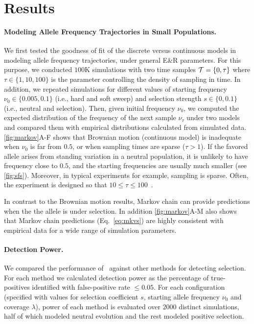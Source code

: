 \section{Results}
\paragraph{Modeling Allele Frequency Trajectories in Small Populations.} 
We first tested the goodness of fit of the discrete versus continuous models in 
modeling allele frequency trajectories, under general E\&R parameters.  For 
this 
purpose, we conducted $100$K
simulations with two time samples ${\cal T}=\{0,\tau\}$ where $\tau\in
\{1,10,100\}$ is the parameter controlling the density of sampling
in time.  In addition, we repeated simulations for different values of
starting frequency $\nu_0\in\{0.005,0.1\}$ (i.e., hard and soft sweep)
and selection strength $s\in\{0,0.1\}$ (i.e., neutral and
selection). Then, given initial frequency $\nu_0$, we computed
the expected distribution of the frequency of the next sample $\nu_\tau$
under two models and compared them with empirical distributions
calculated from simulated data.  \ref{fig:markov}A-F shows that
Brownian motion (continuous model) is inadequate when $\nu_0$ is
far from $0.5$, or when sampling times are sparse ($\tau>1$). If the
favored allele arises from standing variation in a neutral population,
it is unlikely to have frequency close to $0.5$, and the starting
frequencies are usually much smaller (see
\ref{fig:sfs}). Moreover, in typical \dmel experiments for
example, sampling is sparse. Often, the experiment is designed so that
$10\le\tau\le100$~\cite{kofler2013guide, orozco2012adaptation,
  zhou2011experimental,franssen2015patterns}.

In contrast to the Brownian motion results,  Markov chain can provide 
predictions when the the allele is under selection. In addition 
\ref{fig:markov}A-M
also shows that Markov chain predictions (Eq.~\ref{eq:mkvs}) are
highly consistent with empirical data for a wide range of simulation
parameters.

\paragraph{Detection Power.} 
We compared the performance of \comale\ against other methods for
detecting selection. For each method we calculated detection power as the 
percentage of true-positives identified with false-positive rate $\le 0.05$. For 
each
configuration (specified with values for selection coefficient $s$,
starting allele frequency $\nu_0$ and coverage $\lambda$), power of each method 
is evaluated over $2000$ distinct simulations, half of which modeled neutral 
evolution
and the rest modeled positive selection.



